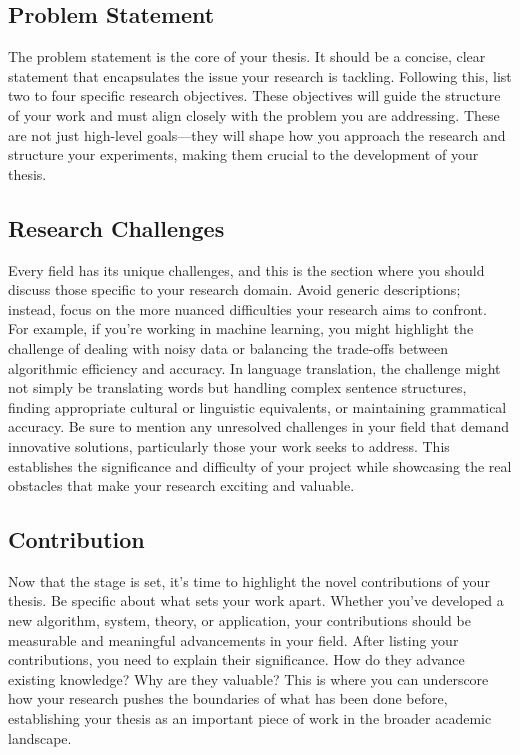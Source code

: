 \documentclass{iutbscthesis}
\begin{document}
\subsection{Problem Statement}
The problem statement is the core of your thesis. It should be a concise, clear statement that encapsulates the issue your research is tackling. Following this, list two to four specific research objectives. These objectives will guide the structure of your work and must align closely with the problem you are addressing. These are not just high-level goals—they will shape how you approach the research and structure your experiments, making them crucial to the development of your thesis.

\subsection{Research Challenges}
Every field has its unique challenges, and this is the section where you should discuss those specific to your research domain. Avoid generic descriptions; instead, focus on the more nuanced difficulties your research aims to confront. For example, if you're working in machine learning, you might highlight the challenge of dealing with noisy data or balancing the trade-offs between algorithmic efficiency and accuracy. In language translation, the challenge might not simply be translating words but handling complex sentence structures, finding appropriate cultural or linguistic equivalents, or maintaining grammatical accuracy. Be sure to mention any unresolved challenges in your field that demand innovative solutions, particularly those your work seeks to address. This establishes the significance and difficulty of your project while showcasing the real obstacles that make your research exciting and valuable.

\subsection{Contribution}
Now that the stage is set, it's time to highlight the novel contributions of your thesis. Be specific about what sets your work apart. Whether you’ve developed a new algorithm, system, theory, or application, your contributions should be measurable and meaningful advancements in your field. After listing your contributions, you need to explain their significance. How do they advance existing knowledge? Why are they valuable? This is where you can underscore how your research pushes the boundaries of what has been done before, establishing your thesis as an important piece of work in the broader academic landscape.
\end{document}
